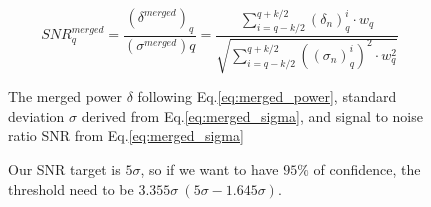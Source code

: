 \begin{equation}
    \label{eq:merged_snr}
    {SNR}_{q}^{merged} = \frac{(\delta^{merged})_{q}}{(\sigma^{merged}){q}} = \frac{\sum_{i = q-k/2}^{q+k/2}(\delta_{n})_{q}^{i} \cdot {w_{q}}}{ \sqrt{\sum_{i = q-k/2}^{q+k/2} ((\sigma_{n})_{q}^{i})^2 \cdot {w_{q}^2}}}
\end{equation}


\begin{figure}[h]
    \centering
    \caption{The merged power $\delta$ following Eq.\eqref{eq:merged_power}, standard deviation $\sigma$ derived from Eq.\eqref{eq:merged_sigma}, and signal to noise ratio SNR from Eq.\eqref{eq:merged_sigma}}
    \label{fig:merged_data}
\end{figure}

\begin{figure}[hbt!]
    \centering
    \caption{Our SNR target is $5\sigma$, so if we want to have $95\% $ of confidence, the threshold need to be $3.355\sigma \  (5\sigma - 1.645\sigma)$. }
    \label{fig:SNR_histogram}
\end{figure}


